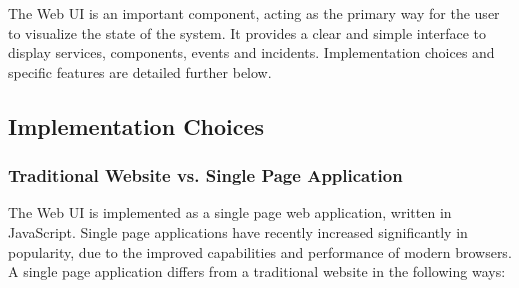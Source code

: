 \documentclass{cshonours}
\begin{document}
The Web UI is an important component, acting as the primary way for the user to visualize the state of the system. It provides a clear and simple interface to display services, components, events and incidents. Implementation choices and specific features are detailed further below.

\subsection{Implementation Choices}

\subsubsection{Traditional Website vs. Single Page Application}

The Web UI is implemented as a single page web application, written in JavaScript. Single page applications have recently increased significantly in popularity, due to the improved capabilities and performance of modern browsers. A single page application differs from a traditional website in the following ways:
\end{document}
